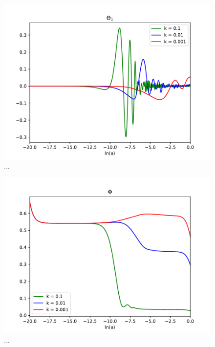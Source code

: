 \documentclass{aa}
\begin{document}
\begin{figure}[h!]
   \includegraphics[scale=0.5]{Figures/M3_theta1.pdf}
   \caption{...}\label{fig:M3_theta1}
\end{figure}

\begin{figure}[h!]
   \includegraphics[scale=0.5]{Figures/M3_phi.pdf}
   \caption{...}\label{fig:M3_phi}
\end{figure}
\end{document}

